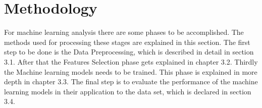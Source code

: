 \documentclass[../masterarbeit.tex]{subfiles}
\begin{document}
	


















\section{Methodology}

For machine learning analysis there are some phases to be accomplished. The methods used for processing these stages are explained in this section. The first step to be done is the Data Preprocessing, which is described in detail in section 3.1. After that the Features Selection phase gets explained in chapter 3.2. Thirdly the Machine learning models needs to be trained. This phase is explained in more depth in chapter 3.3. The final step is to evaluate the performance of the machine learning models in their application to the data set, which is declared in section 3.4.





















\end{document}
